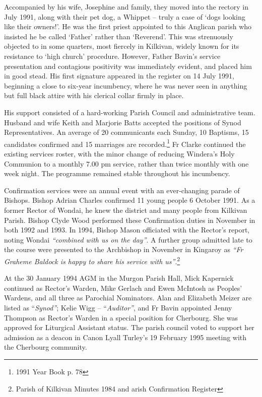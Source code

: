 Accompanied by his wife, Josephine and family, they moved into the rectory in July 1991, along with their pet dog, a Whippet -- truly a case of `dogs looking like their owners!'. He was the first priest appointed to this Anglican parish who insisted he be called `Father' rather than `Reverend'. This was strenuously objected to in some quarters, most fiercely in Kilkivan, widely known for its resistance to `high church' procedure. However, Father Bavin's service presentation and contagious positivity was immediately evident, and placed him in good stead. His first signature appeared in the register on 14 July 1991, beginning a close to six-year incumbency, where he was never seen in anything but full black attire with his clerical collar firmly in place.

His support consisted of a hard-working Parish Council and administrative team. Husband and wife Keith and Marjorie Batts accepted the positions of Synod Representatives. An average of 20 communicants each Sunday, 10 Baptisms, 15 candidates confirmed and 15 marriages are recorded.\footnote{1991 Year Book p. 78} Fr Clarke continued the existing services roster, with the minor change of reducing Windera's Holy Communion to a monthly 7.00 pm service, rather than twice monthly with one week night. The programme remained stable throughout his incumbency.

Confirmation services were an annual event with an ever-changing parade of Bishops. Bishop Adrian Charles confirmed 11 young people 6 October 1991. As a former Rector of Wondai, he knew the district and many people from Kilkivan Parish. Bishop Clyde Wood performed these Confirmation duties in November in both 1992 and 1993. In 1994, Bishop Mason officiated with the Rector's report, noting Wondai \emph{``combined with us on the day''}. A further group admitted late to the course were presented to the Archbishop in November in Kingaroy as \emph{``Fr Graheme Baldock is happy to share his service with us''}.\footnote{Parish of Kilkivan Minutes 1984 and arish Confirmation Register}

At the 30 January 1994 AGM in the Murgon Parish Hall, Mick Kapernick continued as Rector's Warden, Mike Gerlach and Ewen McIntosh as Peoples' Wardens, and all three as Parochial Nominators. Alan and Elizabeth Meizer are listed as ``\emph{Synod''}; Kelie Wigg -- ``\emph{Auditor''}, and Fr Bavin appointed Jenny Thompson as Rector's Warden in a special position for Cherbourg. She was approved for Liturgical Assistant status. The parish council voted to support her admission as a deacon in Canon Lyall Turley's 19 February 1995 meeting with the Cherbourg community.

